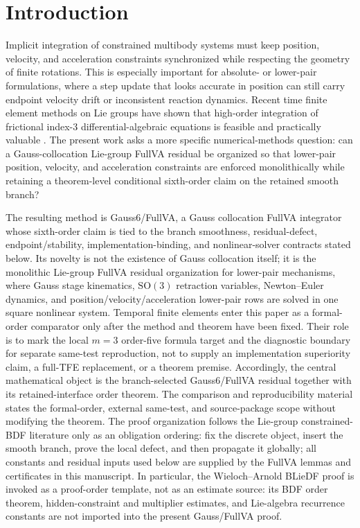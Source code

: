 \documentclass[preprint,12pt]{elsarticle}
\newcommand{\method}{Gauss6\slash FullVA}
\newcommand{\tfe}{TFE}
\begin{document}
\section{Introduction}

Implicit integration of constrained multibody systems must keep position,
velocity, and acceleration constraints synchronized while respecting the
geometry of finite rotations. This is especially important for absolute- or
lower-pair formulations, where a step update that looks accurate in position
can still carry endpoint velocity drift or inconsistent reaction dynamics.
Recent time finite element methods on Lie groups have shown that high-order
integration of frictional index-3 differential-algebraic equations is feasible
and practically valuable \cite{chaturvedi2026tfe}. The present work asks a
more specific numerical-methods question: can a Gauss-collocation Lie-group
FullVA residual be organized so that lower-pair position, velocity, and
acceleration constraints are enforced monolithically while retaining a
theorem-level conditional sixth-order claim on the retained smooth branch?

The resulting method is \method{}, a Gauss collocation FullVA integrator whose
sixth-order claim is tied to the branch smoothness, residual-defect,
endpoint/stability, implementation-binding, and nonlinear-solver contracts
stated below. Its novelty is not the existence
of Gauss collocation itself; it is the monolithic Lie-group FullVA residual
organization for lower-pair mechanisms, where Gauss stage kinematics,
$\mathrm{SO}(3)$ retraction variables, Newton--Euler dynamics, and
position/velocity/acceleration lower-pair rows are solved in one square
nonlinear system. Temporal finite elements enter this paper as a formal-order
comparator only after the method and theorem have been fixed.  Their role is
to mark the local \(m=3\) order-five formula target and the diagnostic
boundary for separate same-test reproduction, not to supply an implementation
superiority claim, a full-\tfe{} replacement, or a theorem premise.
Accordingly, the central mathematical object is the branch-selected
\method{} residual together with its retained-interface order theorem. The
comparison and reproducibility material states the formal-order, external
same-test, and source-package scope without modifying the theorem.
The proof organization follows the Lie-group constrained-BDF literature only
as an obligation ordering: fix the discrete object, insert the smooth branch,
prove the local defect, and then propagate it globally; all constants and
residual inputs used below are supplied by the FullVA lemmas and certificates
in this manuscript.
In particular, the Wieloch--Arnold BLieDF proof is invoked as a proof-order
template, not as an estimate source: its BDF order theorem, hidden-constraint
and multiplier estimates, and Lie-algebra recurrence constants are not
imported into the present Gauss/FullVA proof.
\end{document}
